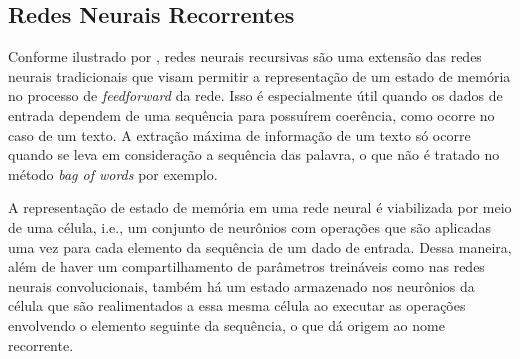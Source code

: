 \subsection{Redes Neurais Recorrentes}

Conforme ilustrado por \cite{ColahLSTM}, redes neurais recursivas são uma extensão das redes neurais tradicionais que visam permitir a representação de um estado de memória no processo de \textit{feedforward} da rede. Isso é especialmente útil quando os dados de entrada dependem de uma sequência para possuírem coerência, como ocorre no caso de um texto. A extração máxima de informação de um texto só ocorre quando se leva em consideração a sequência das palavra, o que não é tratado no método \textit{bag of words} por exemplo.

A representação de estado de memória em uma rede neural é viabilizada por meio de uma célula, i.e., um conjunto de neurônios com operações que são aplicadas uma vez para cada elemento da sequência de um dado de entrada. Dessa maneira, além de haver um compartilhamento de parâmetros treináveis como nas redes neurais convolucionais, também há um estado armazenado nos neurônios da célula que são realimentados a essa mesma célula ao executar as operações envolvendo o elemento seguinte da sequência, o que dá origem ao nome recorrente.
